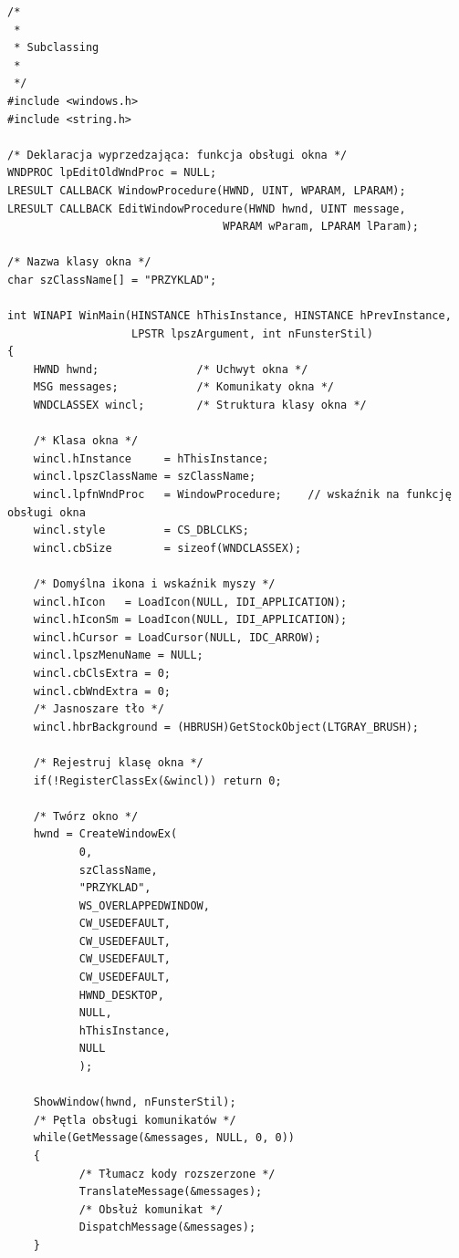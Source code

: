 \begin{scriptsize}
\begin{verbatim}
/*
 *
 * Subclassing
 *
 */
#include <windows.h>
#include <string.h>

/* Deklaracja wyprzedzająca: funkcja obsługi okna */
WNDPROC lpEditOldWndProc = NULL;
LRESULT CALLBACK WindowProcedure(HWND, UINT, WPARAM, LPARAM);
LRESULT CALLBACK EditWindowProcedure(HWND hwnd, UINT message, 
                                 WPARAM wParam, LPARAM lParam);

/* Nazwa klasy okna */
char szClassName[] = "PRZYKLAD";

int WINAPI WinMain(HINSTANCE hThisInstance, HINSTANCE hPrevInstance, 
                   LPSTR lpszArgument, int nFunsterStil)
{
    HWND hwnd;               /* Uchwyt okna */
    MSG messages;            /* Komunikaty okna */
    WNDCLASSEX wincl;        /* Struktura klasy okna */

    /* Klasa okna */
    wincl.hInstance     = hThisInstance;
    wincl.lpszClassName = szClassName;
    wincl.lpfnWndProc   = WindowProcedure;    // wskaźnik na funkcję obsługi okna  
    wincl.style         = CS_DBLCLKS;                 
    wincl.cbSize        = sizeof(WNDCLASSEX);

    /* Domyślna ikona i wskaźnik myszy */
    wincl.hIcon   = LoadIcon(NULL, IDI_APPLICATION);
    wincl.hIconSm = LoadIcon(NULL, IDI_APPLICATION);
    wincl.hCursor = LoadCursor(NULL, IDC_ARROW);
    wincl.lpszMenuName = NULL; 
    wincl.cbClsExtra = 0;   
    wincl.cbWndExtra = 0;   
    /* Jasnoszare tło */
    wincl.hbrBackground = (HBRUSH)GetStockObject(LTGRAY_BRUSH);

    /* Rejestruj klasę okna */
    if(!RegisterClassEx(&wincl)) return 0;

    /* Twórz okno */
    hwnd = CreateWindowEx(
           0,                   
           szClassName,         
           "PRZYKLAD",       
           WS_OVERLAPPEDWINDOW, 
           CW_USEDEFAULT,       
           CW_USEDEFAULT,       
           CW_USEDEFAULT,       
           CW_USEDEFAULT,       
           HWND_DESKTOP,        
           NULL,                
           hThisInstance,       
           NULL                 
           );

    ShowWindow(hwnd, nFunsterStil);
    /* Pętla obsługi komunikatów */
    while(GetMessage(&messages, NULL, 0, 0))
    {
           /* Tłumacz kody rozszerzone */
           TranslateMessage(&messages);
           /* Obsłuż komunikat */
           DispatchMessage(&messages);
    }


\end{verbatim}
\end{scriptsize}

